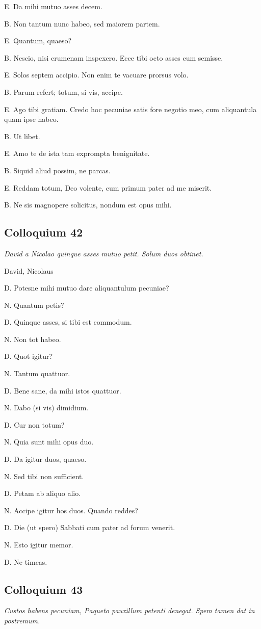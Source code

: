 \documentclass{article}
\begin{document}
E. Da mihi mutuo asses decem.

B. Non tantum nunc habeo, sed maiorem partem.

E. Quantum, quaeso?

B. Nescio, nisi crumenam inspexero. Ecce tibi octo asses cum semisse.

E. Solos septem accipio. Non enim te vacuare prorsus volo.

B. Parum refert; totum, si vis, accipe.

E. Ago tibi gratiam. Credo hoc pecuniae satis fore negotio meo, cum aliquantula quam ipse habeo.

B. Ut libet.

E. Amo te de ista tam exprompta benignitate.

B. Siquid aliud possim, ne parcas.

E. Reddam totum, Deo volente, cum primum pater ad me miserit.

B. Ne sis magnopere solicitus, nondum est opus mihi.

\subsection{Colloquium 42}
\emph{David a Nicolao quinque asses mutuo petit. Solum duos obtinet.}

David, Nicolaus

D. Potesne mihi mutuo dare aliquantulum pecuniae?

N. Quantum petis?

D. Quinque asses, si tibi est commodum.

N. Non tot habeo.

D. Quot igitur?

N. Tantum quattuor.

D. Bene sane, da mihi istos quattuor.

N. Dabo (si vis) dimidium.

D. Cur non totum?

N. Quia sunt mihi opus duo.

D. Da igitur duos, quaeso.

N. Sed tibi non sufficient.

D. Petam ab aliquo alio.

N. Accipe igitur hos duos. Quando reddes?

D. Die (ut spero) Sabbati cum pater ad forum venerit.

N. Esto igitur memor.

D. Ne timeas.

\subsection{Colloquium 43}
\emph{Custos habens pecuniam, Paqueto pauxillum petenti denegat. Spem tamen dat in postremum.}
\end{document}
